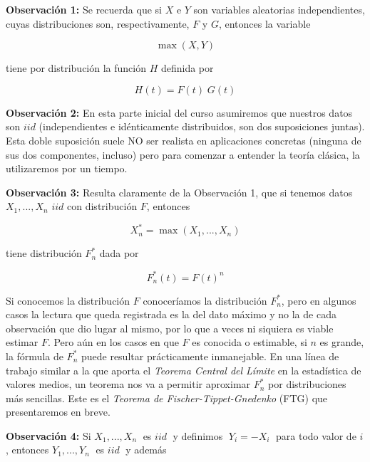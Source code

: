 \documentclass[
  20pt,
]{book}
\theoremstyle{definition}
\theoremstyle{definition}
\theoremstyle{definition}
\theoremstyle{definition}
\theoremstyle{remark}
\begin{document}
\textbf{Observación 1:} Se recuerda que si \(X\) e \(Y\) son variables aleatorias independientes, cuyas
distribuciones son, respectivamente, \(F\) y \(G\),
entonces la variable

\begin{equation}
\max \left( X,Y \right)
\label{eq:1}
\end{equation}

tiene por distribución la función \(H\) definida por

\begin{equation}
H(t)= F(t)\; G(t)
\label{eq:2}
\end{equation}

\textbf{Observación 2:} En esta parte inicial del curso
asumiremos que nuestros datos son \(iid\)
(independientes e idénticamente distribuidos, son
dos suposiciones juntas). Esta doble suposición
suele NO ser realista en aplicaciones concretas
(ninguna de sus dos componentes, incluso) pero
para comenzar a entender la teoría clásica, la
utilizaremos por un tiempo.

\textbf{Observación 3:} Resulta claramente de la
Observación 1, que si tenemos datos \(X_1,...,X_n\) \(iid\) con distribución \(F\), entonces

\begin{equation}
X_n^{\ast}= \max \left( X_1,...,X_n \right)
\end{equation}

tiene distribución \(F_n^\ast\) dada por

\begin{equation}
F_n^\ast (t) = F(t)^n
\end{equation}

Si conocemos la distribución \(F\) conoceríamos la
distribución \(F_n^\ast\), pero en algunos casos la lectura
que queda registrada es la del dato máximo y no la
de cada observación que dio lugar al mismo, por lo
que a veces ni siquiera es viable estimar \(F\).
Pero aún en los casos en que \(F\) es conocida o
estimable, si \(n\) es grande, la fórmula de \(F_n^\ast\) puede resultar prácticamente inmanejable. En una línea de trabajo similar a la que aporta el \emph{Teorema
Central del Límite} en la estadística de valores
medios, un teorema nos va a permitir aproximar
\(F_n^\ast\) por distribuciones más sencillas. Este es el
\emph{Teorema de Fischer-Tippet-Gnedenko} (FTG) que presentaremos en breve.

\textbf{Observación 4:} Si \(X_1,...,X_n\;\) es \(iid\;\) y definimos
\(\;Y_i = -X_i\;\) para todo valor de \(i\), entonces \(Y_1,...,Y_n\;\) es \(iid\;\) y además
\end{document}
